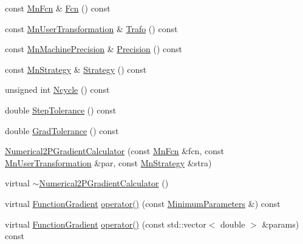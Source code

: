 \begin{DoxyCompactItemize}
const \mbox{\hyperlink{classROOT_1_1Minuit2_1_1MnFcn}{Mn\+Fcn}} \& \mbox{\hyperlink{classROOT_1_1Minuit2_1_1Numerical2PGradientCalculator_a84287ad0b3e0b38769c3ecb00cac1c22}{Fcn}} () const
\item 
const \mbox{\hyperlink{classROOT_1_1Minuit2_1_1MnUserTransformation}{Mn\+User\+Transformation}} \& \mbox{\hyperlink{classROOT_1_1Minuit2_1_1Numerical2PGradientCalculator_a5a0bce9f2c00da4aae9a2b6d3b706010}{Trafo}} () const
\item 
const \mbox{\hyperlink{classROOT_1_1Minuit2_1_1MnMachinePrecision}{Mn\+Machine\+Precision}} \& \mbox{\hyperlink{classROOT_1_1Minuit2_1_1Numerical2PGradientCalculator_a2f964953d797badaf6f2cd476e330c3f}{Precision}} () const
\item 
const \mbox{\hyperlink{classROOT_1_1Minuit2_1_1MnStrategy}{Mn\+Strategy}} \& \mbox{\hyperlink{classROOT_1_1Minuit2_1_1Numerical2PGradientCalculator_a71eb0622c53ddf5d3d319fa676cbbd6e}{Strategy}} () const
\item 
unsigned int \mbox{\hyperlink{classROOT_1_1Minuit2_1_1Numerical2PGradientCalculator_ace5b19ee0df4e3cd09333f519112d2b3}{Ncycle}} () const
\item 
double \mbox{\hyperlink{classROOT_1_1Minuit2_1_1Numerical2PGradientCalculator_afb1bbda7e079db02b02b790e0b0f6cca}{Step\+Tolerance}} () const
\item 
double \mbox{\hyperlink{classROOT_1_1Minuit2_1_1Numerical2PGradientCalculator_aa0011cbece7254c7e17f053916e01c65}{Grad\+Tolerance}} () const
\item 
\mbox{\hyperlink{classROOT_1_1Minuit2_1_1Numerical2PGradientCalculator_ab9e5f93630233d189cb8856753a2cff8}{Numerical2\+P\+Gradient\+Calculator}} (const \mbox{\hyperlink{classROOT_1_1Minuit2_1_1MnFcn}{Mn\+Fcn}} \&fcn, const \mbox{\hyperlink{classROOT_1_1Minuit2_1_1MnUserTransformation}{Mn\+User\+Transformation}} \&par, const \mbox{\hyperlink{classROOT_1_1Minuit2_1_1MnStrategy}{Mn\+Strategy}} \&stra)
\item 
virtual \mbox{\hyperlink{classROOT_1_1Minuit2_1_1Numerical2PGradientCalculator_a9e82d6d064c232e74fc49e2262ebb597}{$\sim$\+Numerical2\+P\+Gradient\+Calculator}} ()
\item 
virtual \mbox{\hyperlink{classROOT_1_1Minuit2_1_1FunctionGradient}{Function\+Gradient}} \mbox{\hyperlink{classROOT_1_1Minuit2_1_1Numerical2PGradientCalculator_a8c90cd467631ecc4cac72187de948b05}{operator()}} (const \mbox{\hyperlink{classROOT_1_1Minuit2_1_1MinimumParameters}{Minimum\+Parameters}} \&) const
\item 
virtual \mbox{\hyperlink{classROOT_1_1Minuit2_1_1FunctionGradient}{Function\+Gradient}} \mbox{\hyperlink{classROOT_1_1Minuit2_1_1Numerical2PGradientCalculator_a213b721d22f8c8f91d85841d7ee1a000}{operator()}} (const std\+::vector$<$ double $>$ \&params) const

\end{DoxyCompactItemize}
